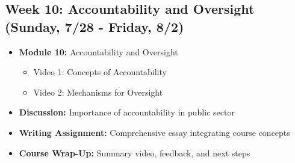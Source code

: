 \documentclass[12pt, letterpaper]{article}
\begin{document}
\subsection*{Week 10: Accountability and Oversight (Sunday, 7/28 - Friday, 8/2)}
\begin{itemize}
    \item \textbf{Module 10:} Accountability and Oversight
    \begin{itemize}
        \item Video 1: Concepts of Accountability
        \item Video 2: Mechanisms for Oversight
    \end{itemize}
    \item \textbf{Discussion:} Importance of accountability in public sector
    \item \textbf{Writing Assignment:} Comprehensive essay integrating course concepts
    \item \textbf{Course Wrap-Up:} Summary video, feedback, and next steps
\end{itemize}
\end{document}
